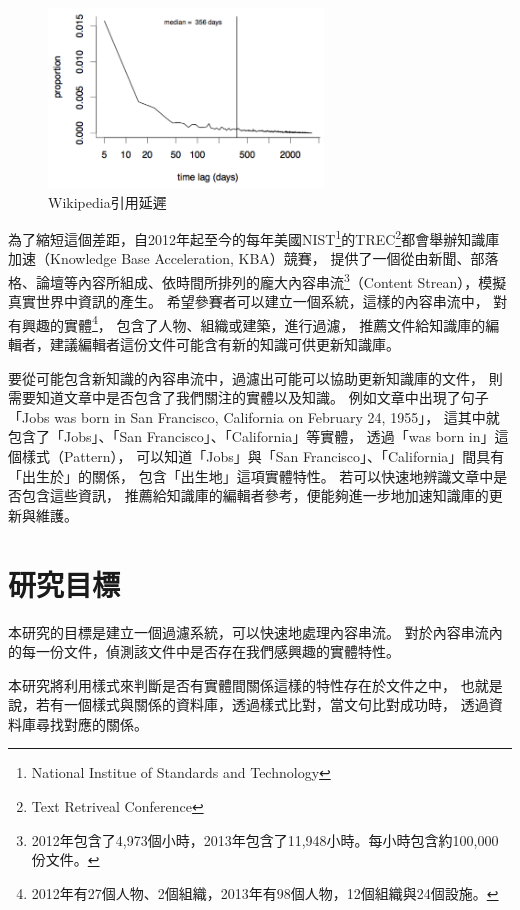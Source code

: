 \begin{figure}
    \centering
    \includegraphics[width=0.65\textwidth]{images/01-wiki-cite-delay}
    \caption{Wikipedia引用延遲}
    \label{i:wikicitenews}
\end{figure}

為了縮短這個差距，自2012年起至今的每年美國NIST\footnote{National Institue of Standards and Technology}的TREC\footnote{Text Retriveal Conference}都會舉辦知識庫加速（Knowledge Base Acceleration, KBA）競賽，
提供了一個從由新聞、部落格、論壇等內容所組成、依時間所排列的龐大內容串流\footnote{2012年包含了4,973個小時，2013年包含了11,948小時。\citep{kba2013}每小時包含約100,000份文件。}（Content Strean），模擬真實世界中資訊的產生。
希望參賽者可以建立一個系統，這樣的內容串流中，
對有興趣的實體\footnote{2012年有27個人物、2個組織，2013年有98個人物，12個組織與24個設施。}，
包含了人物、組織或建築，進行過濾，
推薦文件給知識庫的編輯者，建議編輯者這份文件可能含有新的知識可供更新知識庫。

要從可能包含新知識的內容串流中，過濾出可能可以協助更新知識庫的文件，
則需要知道文章中是否包含了我們關注的實體以及知識。
例如文章中出現了句子「Jobs was born in San Francisco, California on February 24, 1955」，
這其中就包含了「Jobs」、「San Francisco」、「California」等實體，
透過「was born in」這個樣式（Pattern），
可以知道「Jobs」與「San Francisco」、「California」間具有「出生於」的關係，
包含「出生地」這項實體特性。
若可以快速地辨識文章中是否包含這些資訊，
推薦給知識庫的編輯者參考，便能夠進一步地加速知識庫的更新與維護。

%
%
\section{研究目標}
本研究的目標是建立一個過濾系統，可以快速地處理內容串流。
對於內容串流內的每一份文件，偵測該文件中是否存在我們感興趣的實體特性。

本研究將利用樣式來判斷是否有實體間關係這樣的特性存在於文件之中，
也就是說，若有一個樣式與關係的資料庫，透過樣式比對，當文句比對成功時，
透過資料庫尋找對應的關係。

